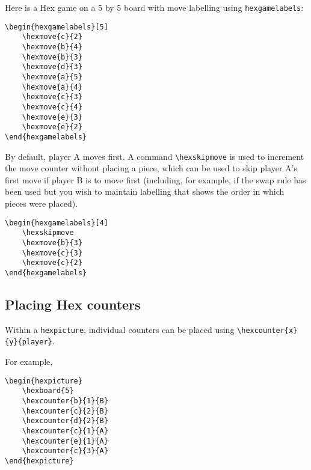 \documentclass[a4paper,12pt]{article}
\begin{document}
    Here is a Hex game on a 5 by 5 board with move labelling using \verb|hexgamelabels|:
    
    \begin{verbatim}\begin{hexgamelabels}[5]
    \hexmove{c}{2}
    \hexmove{b}{4}
    \hexmove{b}{3}
    \hexmove{d}{3}
    \hexmove{a}{5}
    \hexmove{a}{4}
    \hexmove{c}{3}
    \hexmove{c}{4}
    \hexmove{e}{3}
    \hexmove{e}{2}
\end{hexgamelabels}\end{verbatim}
    
    \begin{hexgamelabels}[5]
    \end{hexgamelabels}
    
    By default, player A moves first. A command \verb|\hexskipmove| is used to increment the move counter without placing a piece, which can be used to skip player A's first move if player B is to move first (including, for example, if the swap rule has been used but you wish to maintain labelling that shows the order in which pieces were placed). 
    
    \begin{verbatim}\begin{hexgamelabels}[4]
    \hexskipmove
    \hexmove{b}{3}
    \hexmove{c}{3}
    \hexmove{c}{2}
\end{hexgamelabels}\end{verbatim}
    
    \begin{hexgamelabels}[4]
        \hexskipmove
    \end{hexgamelabels}
    
    \subsection{Placing Hex counters}
    
    Within a \verb|hexpicture|, individual counters can be placed using \verb|\hexcounter{x}{y}{player}|. 
    
    For example,
    
    \begin{verbatim}\begin{hexpicture}
    \hexboard{5}
    \hexcounter{b}{1}{B}
    \hexcounter{c}{2}{B}
    \hexcounter{d}{2}{B}
    \hexcounter{c}{1}{A}
    \hexcounter{e}{1}{A}
    \hexcounter{c}{3}{A}
\end{hexpicture}\end{verbatim}
    
\end{document}
